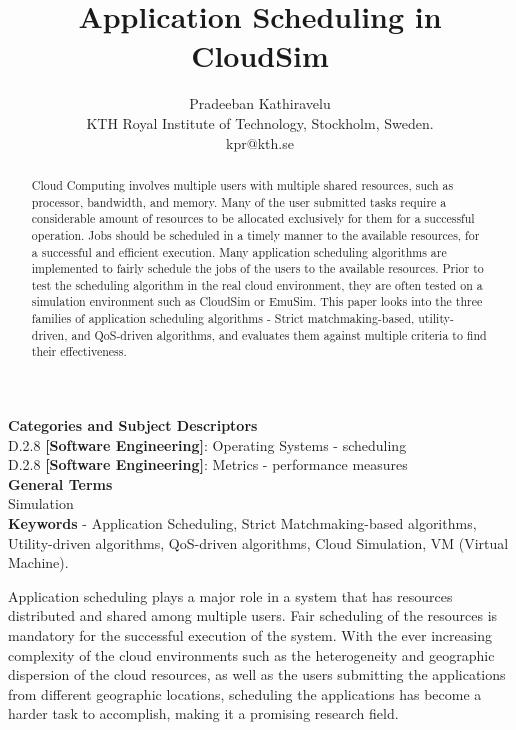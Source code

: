 \documentclass[times, 10pt,twocolumn]{article}
\begin{document}
\title{Application Scheduling in CloudSim}

\author{Pradeeban Kathiravelu\\
KTH Royal Institute of Technology, Stockholm, Sweden.\\ kpr@kth.se\\
}

\maketitle
\thispagestyle{empty}

\begin{abstract}
   Cloud Computing involves multiple users with multiple shared resources, such as processor, bandwidth, and memory. Many of the user submitted tasks require a considerable amount of resources to be allocated exclusively for them for a successful operation. Jobs should be scheduled in a timely manner to the available resources, for a successful and efficient execution. Many application scheduling algorithms are implemented to fairly schedule the jobs of the users to the available resources. Prior to test the scheduling algorithm in the real cloud environment, they are often tested on a simulation environment such as CloudSim or EmuSim. This paper looks into the three families of application scheduling algorithms -  Strict matchmaking-based, utility-driven, and QoS-driven algorithms, and evaluates them against multiple criteria to find their effectiveness. 
\end{abstract}


\textbf{Categories and Subject Descriptors}\\
D.2.8 \textbf{[Software Engineering]}: Operating Systems - scheduling\\
D.2.8 \textbf{[Software Engineering]}: Metrics - performance measures\\
\textbf{General Terms}\\
Simulation\\
\textbf{Keywords} -  Application Scheduling, Strict Matchmaking-based algorithms, Utility-driven algorithms, QoS-driven algorithms, Cloud Simulation, VM (Virtual Machine).


Application scheduling plays a major role in a system that has resources distributed and shared among multiple users. Fair scheduling of the resources is mandatory for the successful execution of the system. With the ever increasing complexity of the cloud environments such as the heterogeneity and geographic dispersion of the cloud resources, as well as the users submitting the applications from different geographic locations, scheduling the applications has become a harder task to accomplish, making it a promising research field.
\end{document}
